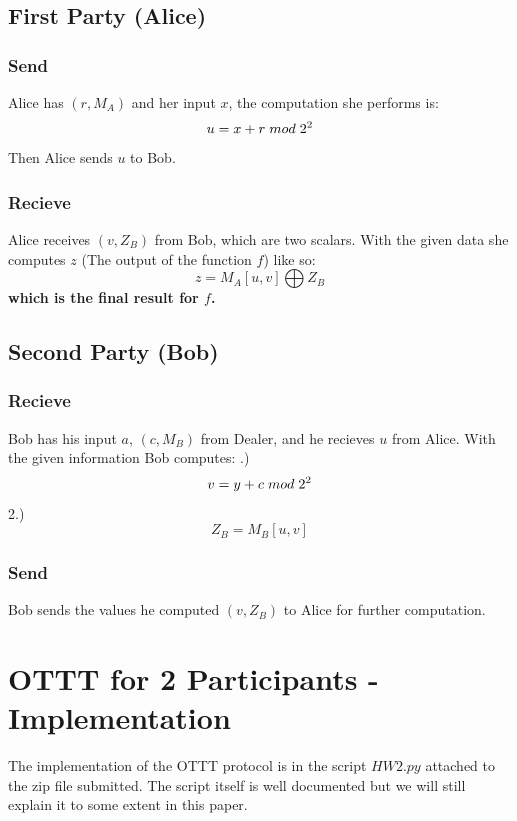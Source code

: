 \documentclass{article}
\begin{document}
\subsection{First Party (Alice)}
\subsubsection{Send}
Alice has $(r,M_A)$ and her input $x$, the computation she performs is:
$$
    u = x + r \hspace{.1cm} mod \hspace{.1cm} 2^2
$$
Then Alice sends $u$ to Bob.

\subsubsection{Recieve}
Alice receives $(v,Z_B)$ from Bob, which are two scalars. With the given data she computes $z$ (The output of the function $f$) like so:
$$
    z = M_A[u,v] \bigoplus Z_B
$$
\textbf{which is the final result for $f$.}

\subsection{Second Party (Bob)}
\subsubsection{Recieve}
Bob has his input $a$, $(c,M_B)$ from Dealer, and he recieves $u$ from Alice. With the given information Bob computes:
.)
$$
    v = y + c \hspace{.1cm} mod \hspace{.1cm} 2^2
$$
2.)
$$
    Z_B = M_B[u,v]
$$

\subsubsection{Send}
Bob sends the values he computed $(v,Z_B)$ to Alice for further computation.

\section{OTTT for 2 Participants - Implementation}
The implementation of the OTTT protocol is in the script $HW2.py$ attached to the zip file submitted. The script itself is well documented but we will still explain it to some extent in this paper.
\newpage
\end{document}
